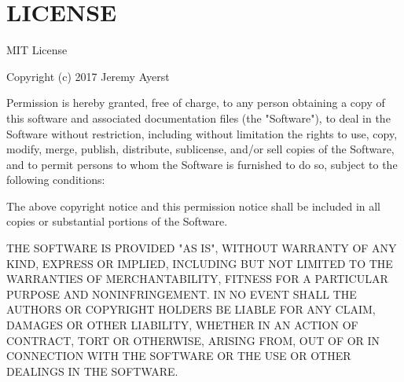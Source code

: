 \chapter{LICENSE}
\hypertarget{md_node__modules_2react-chartjs-2_2_l_i_c_e_n_s_e}{}\label{md_node__modules_2react-chartjs-2_2_l_i_c_e_n_s_e}
MIT License

Copyright (c) 2017 Jeremy Ayerst

Permission is hereby granted, free of charge, to any person obtaining a copy of this software and associated documentation files (the "{}\+Software"{}), to deal in the Software without restriction, including without limitation the rights to use, copy, modify, merge, publish, distribute, sublicense, and/or sell copies of the Software, and to permit persons to whom the Software is furnished to do so, subject to the following conditions\+:

The above copyright notice and this permission notice shall be included in all copies or substantial portions of the Software.

THE SOFTWARE IS PROVIDED "{}\+AS IS"{}, WITHOUT WARRANTY OF ANY KIND, EXPRESS OR IMPLIED, INCLUDING BUT NOT LIMITED TO THE WARRANTIES OF MERCHANTABILITY, FITNESS FOR A PARTICULAR PURPOSE AND NONINFRINGEMENT. IN NO EVENT SHALL THE AUTHORS OR COPYRIGHT HOLDERS BE LIABLE FOR ANY CLAIM, DAMAGES OR OTHER LIABILITY, WHETHER IN AN ACTION OF CONTRACT, TORT OR OTHERWISE, ARISING FROM, OUT OF OR IN CONNECTION WITH THE SOFTWARE OR THE USE OR OTHER DEALINGS IN THE SOFTWARE. 